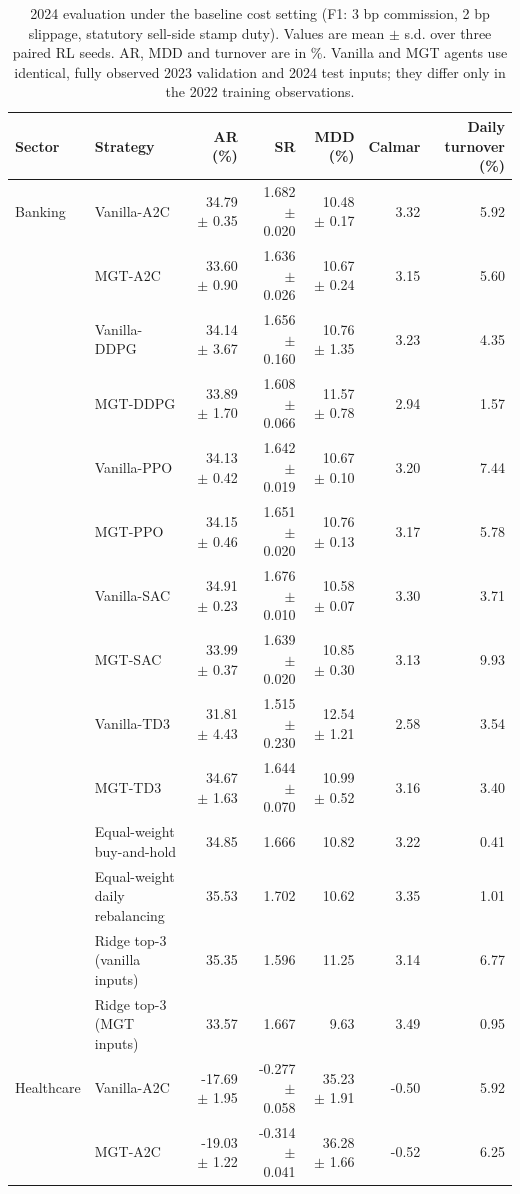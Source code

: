 \begin{table}[!t]\centering\small\color{blue}
\caption{2024 evaluation under the baseline cost setting (F1: 3 bp commission, 2 bp slippage, statutory sell-side stamp duty). Values are mean $\pm$ s.d. over three paired RL seeds. AR, MDD and turnover are in \%. Vanilla and MGT agents use identical, fully observed 2023 validation and 2024 test inputs; they differ only in the 2022 training observations.}
\label{tab:main_f1}
\begin{tabular}{llrrrrr}\toprule
Sector & Strategy & AR (\%) & SR & MDD (\%) & Calmar & Daily turnover (\%) \\ \midrule
Banking & Vanilla-A2C & 34.79 $\pm$ 0.35 & 1.682 $\pm$ 0.020 & 10.48 $\pm$ 0.17 & 3.32 & 5.92 \\
 & MGT-A2C & 33.60 $\pm$ 0.90 & 1.636 $\pm$ 0.026 & 10.67 $\pm$ 0.24 & 3.15 & 5.60 \\
 & Vanilla-DDPG & 34.14 $\pm$ 3.67 & 1.656 $\pm$ 0.160 & 10.76 $\pm$ 1.35 & 3.23 & 4.35 \\
 & MGT-DDPG & 33.89 $\pm$ 1.70 & 1.608 $\pm$ 0.066 & 11.57 $\pm$ 0.78 & 2.94 & 1.57 \\
 & Vanilla-PPO & 34.13 $\pm$ 0.42 & 1.642 $\pm$ 0.019 & 10.67 $\pm$ 0.10 & 3.20 & 7.44 \\
 & MGT-PPO & 34.15 $\pm$ 0.46 & 1.651 $\pm$ 0.020 & 10.76 $\pm$ 0.13 & 3.17 & 5.78 \\
 & Vanilla-SAC & 34.91 $\pm$ 0.23 & 1.676 $\pm$ 0.010 & 10.58 $\pm$ 0.07 & 3.30 & 3.71 \\
 & MGT-SAC & 33.99 $\pm$ 0.37 & 1.639 $\pm$ 0.020 & 10.85 $\pm$ 0.30 & 3.13 & 9.93 \\
 & Vanilla-TD3 & 31.81 $\pm$ 4.43 & 1.515 $\pm$ 0.230 & 12.54 $\pm$ 1.21 & 2.58 & 3.54 \\
 & MGT-TD3 & 34.67 $\pm$ 1.63 & 1.644 $\pm$ 0.070 & 10.99 $\pm$ 0.52 & 3.16 & 3.40 \\
 & Equal-weight buy-and-hold & 34.85 & 1.666 & 10.82 & 3.22 & 0.41 \\
 & Equal-weight daily rebalancing & 35.53 & 1.702 & 10.62 & 3.35 & 1.01 \\
 & Ridge top-3 (vanilla inputs) & 35.35 & 1.596 & 11.25 & 3.14 & 6.77 \\
 & Ridge top-3 (MGT inputs) & 33.57 & 1.667 & 9.63 & 3.49 & 0.95 \\
\midrule
Healthcare & Vanilla-A2C & -17.69 $\pm$ 1.95 & -0.277 $\pm$ 0.058 & 35.23 $\pm$ 1.91 & -0.50 & 5.92 \\
 & MGT-A2C & -19.03 $\pm$ 1.22 & -0.314 $\pm$ 0.041 & 36.28 $\pm$ 1.66 & -0.52 & 6.25 \\

\end{tabular}
\end{table}
